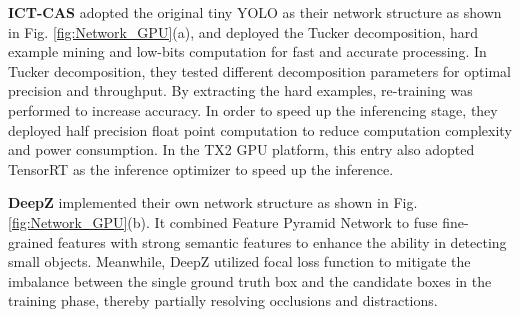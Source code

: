 \documentclass[10pt,journal,compsoc]{IEEEtran}
\begin{document}
\textbf{{ICT-CAS}} adopted the original tiny YOLO as their network structure as shown in Fig. \ref{fig:Network_GPU}(a), and deployed the Tucker decomposition, hard example mining and low-bits computation for fast and accurate processing.
In Tucker decomposition, they tested different decomposition parameters for optimal precision and throughput.
By extracting the hard examples, re-training was performed to increase accuracy.
In order to speed up the inferencing stage, they deployed half precision float point computation to reduce computation complexity and power consumption.
In the TX2 GPU platform, this entry also adopted TensorRT \cite{tensorrt} as the inference optimizer to speed up the inference.

\textbf{DeepZ} implemented their own network structure as shown in Fig. \ref{fig:Network_GPU}(b).
It combined Feature Pyramid Network \cite{lin2017feature} to fuse fine-grained features with strong semantic features to enhance the ability in detecting small objects. Meanwhile, DeepZ utilized focal loss function to mitigate the imbalance between the single ground truth box and the candidate boxes in the training phase, thereby partially resolving occlusions and distractions.
\end{document}

